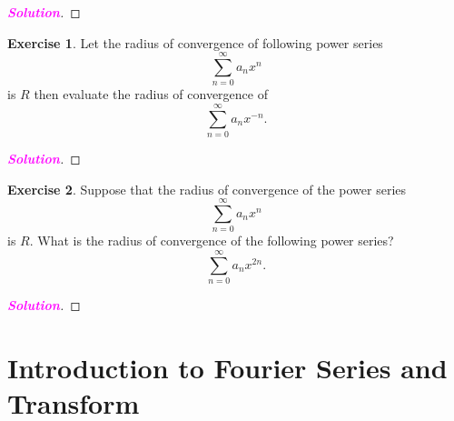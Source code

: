 \documentclass[12pt,openany]{book}
\theoremstyle{definition}
\newtheorem{exercise}{Exercise}[chapter]
\newcommand{\sol}{\textcolor{magenta}{\bf Solution}}
\begin{document}
	\begin{proof}[\sol]
		
	\end{proof}
	\begin{tcolorbox}[colframe=execolor, title={\color{white}\bf}]
		\begin{exercise}
			Let the radius of convergence of following power series
			\[
			\sum_{n=0}^{\infty} a_nx^n
			\]
			is \( R \) then evaluate the radius of convergence of
			\[
			\sum_{n=0}^{\infty} a_nx^{-n}.
			\]
		\end{exercise}
	\end{tcolorbox}
	\begin{proof}[\sol]
		
	\end{proof}
	\begin{tcolorbox}[colframe=execolor, title={\color{white}\bf}]
		\begin{exercise}
			Suppose that the radius of convergence of the power series
			\[
			\sum_{n=0}^{\infty} a_nx^n
			\]
			is \( R \). What is the radius of convergence of the following power series?
			\[
			\sum_{n=0}^{\infty} a_nx^{2n}.
			\]
		\end{exercise}
	\end{tcolorbox}
	\begin{proof}[\sol]
		
	\end{proof}
	\newpage
	\chapter{Introduction to Fourier Series and Transform}
\end{document}
